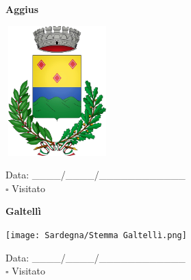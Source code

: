 \documentclass[a5paper,12pt]{article}
\begin{document}
\noindent
\begin{minipage}[t]{0.45\textwidth}
    \begin{center}
        \textbf{Aggius}
    \end{center}
    \vspace{-0.5cm} %
    \begin{center}
        \includegraphics[height= 5cm, width=4cm]{Sardegna/Stemma Aggius.png}
    \end{center}
    \vspace{-0.4cm} %
    \begin{flushleft}
        Data: \_\_\_\_/\_\_\_\_/\_\_\_\_\_\_\_\_\_\_\_\_ \\
        $\square$ Visitato
    \end{flushleft}
\end{minipage}
\hfill
\noindent
\begin{minipage}[t]{0.45\textwidth}
    \begin{center}
        \textbf{Galtellì}
    \end{center}
    \vspace{-0.5cm} %
    \begin{center}
        \texttt{[image: Sardegna/Stemma Galtellì.png]}
    \end{center}
    \vspace{-0.4cm} %
    \begin{flushleft}
        Data: \_\_\_\_/\_\_\_\_/\_\_\_\_\_\_\_\_\_\_\_\_ \\
        $\square$ Visitato
    \end{flushleft}
\end{minipage}

\vspace{0.7cm}
\end{document}
